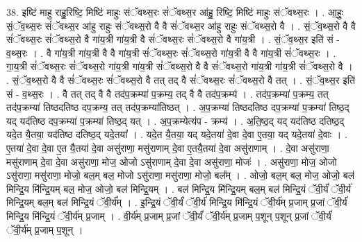 \documentclass[17pt]{extarticle}
\begin{document}
38. इष्टि॑ माहु राहु॒रिष्टि॒ मिष्टि॑ माहुः संॅवथ्स॒रः सं॑ॅवथ्स॒र आ॑हु॒ रिष्टि॒ मिष्टि॑ माहुः संॅवथ्स॒रः । . आ॒हुः॒ सं॒ॅव॒थ्स॒रः सं॑ॅवथ्स॒र आ॑हु राहुः संॅवथ्स॒रो वै वै सं॑ॅवथ्स॒र आ॑हु राहुः संॅवथ्स॒रो वै । . सं॒ॅव॒थ्स॒रो वै वै सं॑ॅवथ्स॒रः सं॑ॅवथ्स॒रो वै गा॑य॒त्री गा॑य॒त्री वै सं॑ॅवथ्स॒रः सं॑ॅवथ्स॒रो वै गा॑य॒त्री । . सं॒ॅव॒थ्स॒र इति॑ सं - व॒थ्स॒रः । . वै गा॑य॒त्री गा॑य॒त्री वै वै गा॑य॒त्री सं॑ॅवथ्स॒रः सं॑ॅवथ्स॒रो गा॑य॒त्री वै वै गा॑य॒त्री सं॑ॅवथ्स॒रः । . गा॒य॒त्री सं॑ॅवथ्स॒रः सं॑ॅवथ्स॒रो गा॑य॒त्री गा॑य॒त्री सं॑ॅवथ्स॒रो वै वै सं॑ॅवथ्स॒रो गा॑य॒त्री गा॑य॒त्री सं॑ॅवथ्स॒रो वै । . सं॒ॅव॒थ्स॒रो वै वै सं॑ॅवथ्स॒रः सं॑ॅवथ्स॒रो वै तत् तद् वै सं॑ॅवथ्स॒रः सं॑ॅवथ्स॒रो वै तत् । . सं॒ॅव॒थ्स॒र इति॑ सं - व॒थ्स॒रः । . वै तत् तद् वै वै तद॑प॒क्रम्या॑ प॒क्रम्य॒ तद् वै वै तद॑प॒क्रम्य॑ । . तद॑प॒क्रम्या॑ प॒क्रम्य॒ तत् तद॑प॒क्रम्या॑ तिष्ठदतिष्ठ दप॒क्रम्य॒ तत् तद॑प॒क्रम्या॑तिष्ठत् । . अ॒प॒क्रम्या॑ तिष्ठदतिष्ठ दप॒क्रम्या॑ प॒क्रम्या॑ तिष्ठ॒द् यद् यद॑तिष्ठ दप॒क्रम्या॑ प॒क्रम्या॑ तिष्ठ॒द् यत् । . अ॒प॒क्रम्येत्य॑प - क्रम्य॑ । . अ॒ति॒ष्ठ॒द् यद् यद॑तिष्ठ दतिष्ठ॒द् यदे॒त यै॒तया॒ यद॑तिष्ठ दतिष्ठ॒द् यदे॒तया᳚ । . यदे॒त यै॒तया॒ यद् यदे॒तया॑ दे॒वा दे॒वा ए॒तया॒ यद् यदे॒तया॑ दे॒वाः । . ए॒तया॑ दे॒वा दे॒वा ए॒त यै॒तया॑ दे॒वा असु॑राणा॒ मसु॑राणाम् दे॒वा ए॒तयै॒तया॑ दे॒वा असु॑राणाम् । . दे॒वा असु॑राणा॒ मसु॑राणाम् दे॒वा दे॒वा असु॑राणा॒ मोज॒ ओजो ऽसु॑राणाम् दे॒वा दे॒वा असु॑राणा॒ मोजः॑ । . असु॑राणा॒ मोज॒ ओजो ऽसु॑राणा॒ मसु॑राणा॒ मोजो॒ बल॒म् बल॒ मोजो ऽसु॑राणा॒ मसु॑राणा॒ मोजो॒ बल᳚म् । . ओजो॒ बल॒म् बल॒ मोज॒ ओजो॒ बल॑ मिन्द्रि॒य मि॑न्द्रि॒यम् बल॒ मोज॒ ओजो॒ बल॑ मिन्द्रि॒यम् । . बल॑ मिन्द्रि॒य मि॑न्द्रि॒यम् बल॒म् बल॑ मिन्द्रि॒यं ॅवी॒र्यं॑ ॅवी॒र्य॑ मिन्द्रि॒यम् बल॒म् बल॑ मिन्द्रि॒यं ॅवी॒र्य᳚म् । . इ॒न्द्रि॒यं ॅवी॒र्यं॑ ॅवी॒र्य॑ मिन्द्रि॒य मि॑न्द्रि॒यं ॅवी॒र्य॑म् प्र॒जाम् प्र॒जां ॅवी॒र्य॑ मिन्द्रि॒य मि॑न्द्रि॒यं ॅवी॒र्य॑म् प्र॒जाम् । . वी॒र्य॑म् प्र॒जाम् प्र॒जां ॅवी॒र्यं॑ ॅवी॒र्य॑म् प्र॒जाम् प॒शून् प॒शून् प्र॒जां ॅवी॒र्यं॑ ॅवी॒र्य॑म् प्र॒जाम् प॒शून् । \newline
\pagebreak
{}
\end{document}
